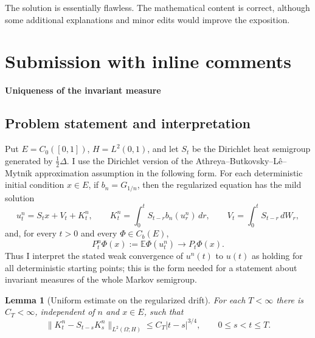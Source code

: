 \documentclass[12pt]{article}
\newtheorem{lemma}{Lemma}
\newcommand{\E}{\mathbb E}
\newcommand{\1}{\mathbf 1}
\begin{document}
The solution is essentially flawless. The mathematical content is correct, although some additional explanations and minor edits would improve the exposition.

\section{Submission with inline comments}

%

\date{}

\begin{center}
{\bf Uniqueness of the invariant measure}
\end{center}

\subsection*{Problem statement and interpretation}

Put \(E=C_0([0,1])\), \(H=L^2(0,1)\), and let \(S_t\) be the Dirichlet heat
semigroup generated by \(\frac12\Delta\).  I use the Dirichlet version of the
Athreya--Butkovsky--L\^e--Mytnik approximation assumption in the following
form.  For each deterministic initial condition \(x\in E\), if \(b_n=G_{1/n}\),
then the regularized equation has the mild solution
\[
  u_t^n=S_t x+V_t+K_t^n,\qquad
  K_t^n=\int_0^tS_{t-r}b_n(u_r^n)\,dr,\qquad
  V_t=\int_0^tS_{t-r}\,dW_r ,
\]
and, for every \(t>0\) and every \(\Phi\in C_b(E)\),
\[
        P_t^n\Phi(x):=\E\Phi(u_t^n)\longrightarrow P_t\Phi(x).
        \tag{1}
\]
Thus I interpret the stated weak convergence of \(u^n(t)\) to \(u(t)\) as
holding for all deterministic starting points; this is the form needed for a
statement about invariant measures of the whole Markov semigroup.

\begin{lemma}[Uniform estimate on the regularized drift]\label{lem:Hestimate}
For each \(T<\infty\) there is \(C_T<\infty\), independent of \(n\) and
\(x\in E\), such that
\[
 \|K_t^n-S_{t-s}K_s^n\|_{L^2(\Omega;H)}
      \le C_T |t-s|^{3/4},\qquad 0\le s<t\le T .             \tag{2}
\]
\end{lemma}
\end{document}
